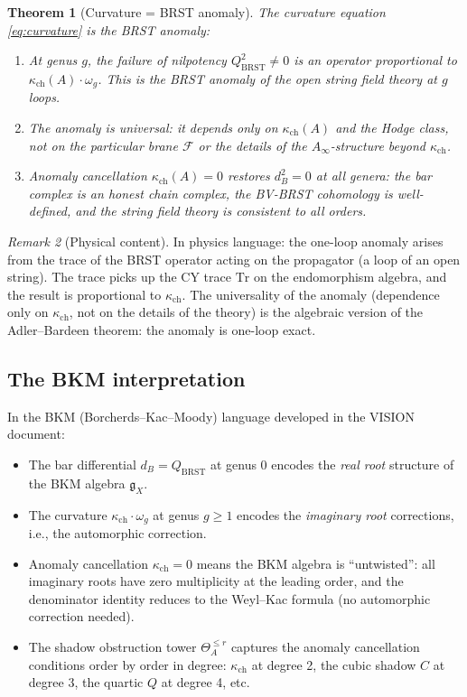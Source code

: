 \documentclass[11pt]{amsart}
\theoremstyle{plain}
\newtheorem{theorem}{Theorem}[section]
\theoremstyle{definition}
\theoremstyle{remark}
\newtheorem{remark}[theorem]{Remark}
\newcommand{\Ainf}{A_\infty}
\newcommand{\Tr}{\mathrm{Tr}}
\newcommand{\BRST}{\mathrm{BRST}}
\newcommand{\cF}{\mathcal{F}}
\begin{document}
\begin{theorem}[Curvature = BRST anomaly]
\label{thm:curvature-anomaly}
The curvature equation \eqref{eq:curvature} is the BRST anomaly:
\begin{enumerate}[label=(\roman*)]
 \item At genus $g$, the failure of nilpotency $Q_{\BRST}^2 \neq 0$ is an operator proportional to $\kappa_{\mathrm{ch}}(A) \cdot \omega_g$. This is the BRST anomaly of the open string field theory at $g$ loops.
 \item The anomaly is \emph{universal}: it depends only on $\kappa_{\mathrm{ch}}(A)$ and the Hodge class, not on the particular brane $\cF$ or the details of the $\Ainf$-structure beyond $\kappa_{\mathrm{ch}}$.
 \item Anomaly cancellation $\kappa_{\mathrm{ch}}(A) = 0$ restores $d_B^2 = 0$ at all genera: the bar complex is an honest chain complex, the BV-BRST cohomology is well-defined, and the string field theory is consistent to all orders.
\end{enumerate}
\end{theorem}

\begin{remark}[Physical content]
In physics language: the one-loop anomaly arises from the trace of the BRST operator acting on the propagator (a loop of an open string). The trace picks up the CY trace $\Tr$ on the endomorphism algebra, and the result is proportional to $\kappa_{\mathrm{ch}}$. The universality of the anomaly (dependence only on $\kappa_{\mathrm{ch}}$, not on the details of the theory) is the algebraic version of the Adler--Bardeen theorem: the anomaly is one-loop exact.
\end{remark}

\subsection{The BKM interpretation}
\label{subsec:bkm-interpretation}

In the BKM (Borcherds--Kac--Moody) language developed in the VISION document:

\begin{itemize}
 \item The bar differential $d_B = Q_{\BRST}$ at genus 0 encodes the \emph{real root} structure of the BKM algebra $\mathfrak{g}_X$.
 \item The curvature $\kappa_{\mathrm{ch}} \cdot \omega_g$ at genus $g \geq 1$ encodes the \emph{imaginary root} corrections, i.e., the automorphic correction.
 \item Anomaly cancellation $\kappa_{\mathrm{ch}} = 0$ means the BKM algebra is ``untwisted'': all imaginary roots have zero multiplicity at the leading order, and the denominator identity reduces to the Weyl--Kac formula (no automorphic correction needed).
 \item The shadow obstruction tower $\Theta_A^{\leq r}$ captures the anomaly cancellation conditions order by order in degree: $\kappa_{\mathrm{ch}}$ at degree 2, the cubic shadow $C$ at degree 3, the quartic $Q$ at degree 4, etc.
\end{itemize}
\end{document}
